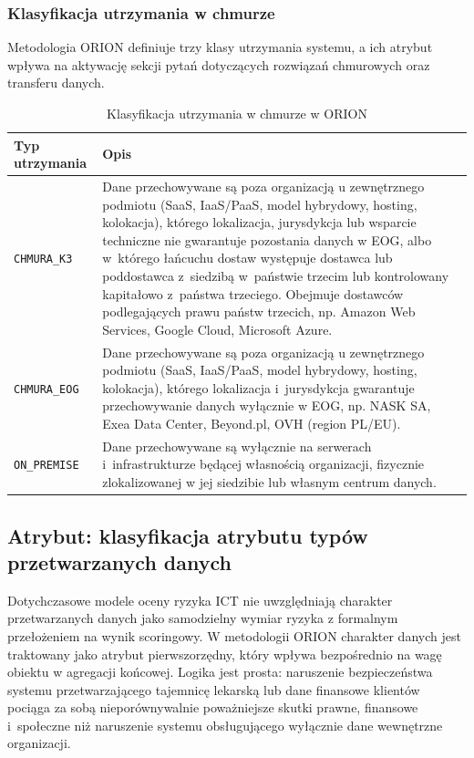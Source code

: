 \subsubsection*{Klasyfikacja utrzymania  w chmurze}
Metodologia ORION definiuje trzy klasy utrzymania systemu, a ich atrybut wpływa na aktywację sekcji pytań dotyczących rozwiązań chmurowych oraz transferu danych.


\begin{table}[H]
\centering
\caption{Klasyfikacja utrzymania w chmurze w ORION}
\label{tab:typy-chmura}
\renewcommand{\arraystretch}{1.4}
\begin{tabular}{p{5cm}p{8cm}}
\toprule
\textbf{Typ utrzymania} & \textbf{Opis}\\
\midrule
\texttt{CHMURA\_K3} & Dane przechowywane są poza organizacją u zewnętrznego podmiotu (SaaS, IaaS/PaaS, model hybrydowy, hosting, kolokacja), którego lokalizacja, jurysdykcja lub wsparcie techniczne nie gwarantuje pozostania danych w EOG, albo w~którego łańcuchu dostaw występuje dostawca lub poddostawca z~siedzibą w~państwie trzecim lub kontrolowany kapitałowo z~państwa trzeciego. Obejmuje dostawców podlegających prawu państw trzecich, np. Amazon Web Services, Google Cloud, Microsoft Azure.\\
\midrule
\texttt{CHMURA\_EOG} & Dane przechowywane są poza organizacją u zewnętrznego podmiotu (SaaS, IaaS/PaaS, model hybrydowy, hosting, kolokacja), którego lokalizacja i~jurysdykcja gwarantuje przechowywanie danych wyłącznie w EOG, np. NASK SA, Exea Data Center, Beyond.pl, OVH (region PL/EU).\\
\midrule
\texttt{ON\_PREMISE} & Dane przechowywane są wyłącznie na serwerach i~infrastrukturze będącej własnością organizacji, fizycznie zlokalizowanej w jej siedzibie lub własnym centrum danych.\\
\bottomrule
\end{tabular}
\end{table}

\subsection{Atrybut: klasyfikacja atrybutu typów przetwarzanych danych}
\label{sec:klasyfikacja-danych}

Dotychczasowe modele oceny ryzyka ICT nie uwzględniają charakter  przetwarzanych danych jako samodzielny wymiar ryzyka z formalnym  przełożeniem na wynik scoringowy. W metodologii ORION charakter danych jest traktowany jako atrybut pierwszorzędny, który wpływa bezpośrednio  na wagę obiektu w agregacji końcowej. Logika jest prosta: naruszenie bezpieczeństwa systemu przetwarzającego tajemnicę lekarską lub dane finansowe klientów pociąga za sobą nieporównywalnie poważniejsze  skutki prawne, finansowe i~społeczne niż naruszenie systemu  obsługującego wyłącznie dane wewnętrzne organizacji.

